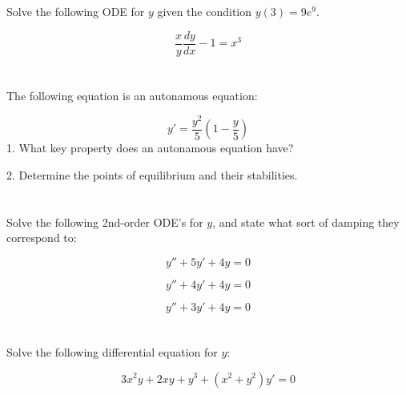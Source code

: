 \section{}

Solve the following ODE for $y$ given the condition $y(3)=9e^9$.

\begin{equation}
    \frac{x}{y} \frac{dy}{dx} - 1 = x^3
\end{equation}





\section{}

The following equation is an autonamous equation:

\begin{equation}
    y'=\frac{y^2}{5}(1-\frac{y}{5})
\end{equation}
1. What key property does an autonamous equation have?


2. Determine the points of equilibrium and their stabilities.





\section{}

Solve the following 2nd-order ODE's for $y$, and state what sort of damping they correspond to:

\begin{equation}
    y'' + 5 y' + 4y = 0 %
\end{equation}


\begin{equation}
    y'' + 4 y' + 4 y = 0 %
\end{equation}


\begin{equation}
    y'' + 3 y' + 4 y = 0 %
\end{equation}




\section{}

Solve the following differential equation for $y$:

\begin{equation}
    3 x^2 y + 2 x y + y^3 + (x^2 + y^2) y' = 0
\end{equation}





